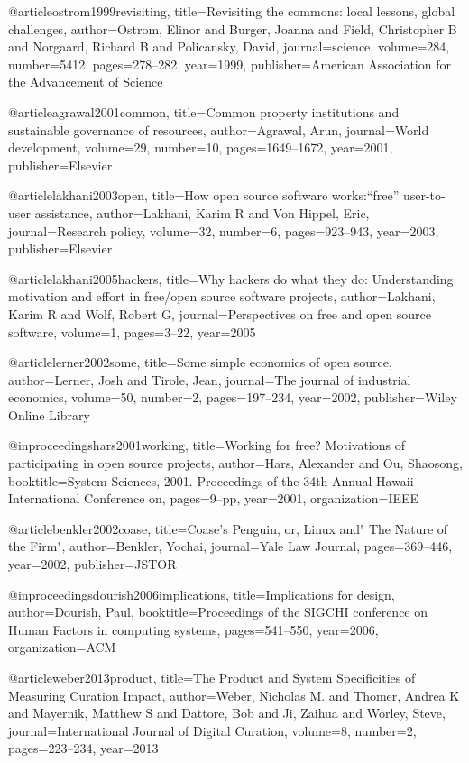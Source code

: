 @article{ostrom1999revisiting,
  title={Revisiting the commons: local lessons, global challenges},
  author={Ostrom, Elinor and Burger, Joanna and Field, Christopher B and Norgaard, Richard B and Policansky, David},
  journal={science},
  volume={284},
  number={5412},
  pages={278--282},
  year={1999},
  publisher={American Association for the Advancement of Science}
}

@article{agrawal2001common,
  title={Common property institutions and sustainable governance of resources},
  author={Agrawal, Arun},
  journal={World development},
  volume={29},
  number={10},
  pages={1649--1672},
  year={2001},
  publisher={Elsevier}
}

@article{lakhani2003open,
  title={How open source software works:“free” user-to-user assistance},
  author={Lakhani, Karim R and Von Hippel, Eric},
  journal={Research policy},
  volume={32},
  number={6},
  pages={923--943},
  year={2003},
  publisher={Elsevier}
}

@article{lakhani2005hackers,
  title={Why hackers do what they do: Understanding motivation and effort in free/open source software projects},
  author={Lakhani, Karim R and Wolf, Robert G},
  journal={Perspectives on free and open source software},
  volume={1},
  pages={3--22},
  year={2005}
}

@article{lerner2002some,
  title={Some simple economics of open source},
  author={Lerner, Josh and Tirole, Jean},
  journal={The journal of industrial economics},
  volume={50},
  number={2},
  pages={197--234},
  year={2002},
  publisher={Wiley Online Library}
}
 
 @inproceedings{hars2001working,
  title={Working for free? Motivations of participating in open source projects},
  author={Hars, Alexander and Ou, Shaosong},
  booktitle={System Sciences, 2001. Proceedings of the 34th Annual Hawaii International Conference on},
  pages={9--pp},
  year={2001},
  organization={IEEE}
}

@article{benkler2002coase,
  title={Coase's Penguin, or, Linux and" The Nature of the Firm"},
  author={Benkler, Yochai},
  journal={Yale Law Journal},
  pages={369--446},
  year={2002},
  publisher={JSTOR}
}

@inproceedings{dourish2006implications,
  title={Implications for design},
  author={Dourish, Paul},
  booktitle={Proceedings of the SIGCHI conference on Human Factors in computing systems},
  pages={541--550},
  year={2006},
  organization={ACM}
}

@article{weber2013product,
  title={The Product and System Specificities of Measuring Curation Impact},
  author={Weber, Nicholas M. and Thomer, Andrea K and Mayernik, Matthew S and Dattore, Bob and Ji, Zaihua and Worley, Steve},
  journal={International Journal of Digital Curation},
  volume={8},
  number={2},
  pages={223--234},
  year={2013}
}

